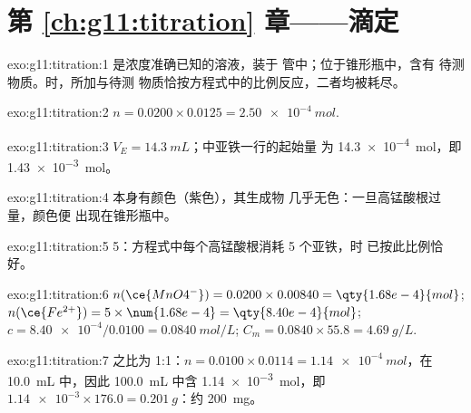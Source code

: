 \section*{第 \ref{ch:g11:titration} 章——滴定}

\begin{solution}{exo:g11:titration:1}
是浓度准确已知的溶液，装于
管中；位于锥形瓶中，含有
待测物质。时，所加与待测
物质恰按方程式中的比例反应，二者均被耗尽。
\end{solution}

\begin{solution}{exo:g11:titration:2}
$n = 0.0200 \times 0.0125 = \qty{2.50e-4}{mol}$.
\end{solution}

\begin{solution}{exo:g11:titration:3}
$V_E = \qty{14.3}{mL}$；中亚铁一行的起始量
为 \qty{14.3e-4}{mol}，即 \qty{1.43e-3}{mol}。
\end{solution}

\begin{solution}{exo:g11:titration:4}
本身有颜色（紫色），其生成物
几乎无色：一旦高锰酸根过量，颜色便
出现在锥形瓶中。
\end{solution}

\begin{solution}{exo:g11:titration:5}
5：方程式中每个高锰酸根消耗 5 个亚铁，时
已按此比例恰好。
%
\end{solution}

\begin{solution}{exo:g11:titration:6}
$n(\ce{MnO4^-}) = 0.0200 \times 0.00840 = \qty{1.68e-4}{mol}$;
$n(\ce{Fe^{2+}}) = 5 \times \num{1.68e-4} = \qty{8.40e-4}{mol}$;
$c = \num{8.40e-4} / 0.0100 = \qty{0.0840}{mol/L}$;
$C_m = 0.0840 \times 55.8 = \qty{4.69}{g/L}$.
\end{solution}

\begin{solution}{exo:g11:titration:7}
之比为 1:1：$n = 0.0100 \times 0.0114 = \qty{1.14e-4}{mol}$，在
\qty{10.0}{mL} 中，因此 \qty{100.0}{mL} 中含 \qty{1.14e-3}{mol}，即
$\num{1.14e-3} \times 176.0 = \qty{0.201}{g}$：约 \qty{200}{mg}。
\end{solution}


